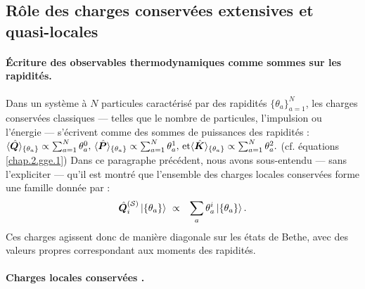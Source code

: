 




%
\subsection{Rôle des charges conservées extensives et quasi-locales}

\paragraph{Écriture des observables thermodynamiques comme sommes sur les rapidités.}

Dans un système à $N$ particules caractérisé par des rapidités $\{ \theta_a \}_{a = 1}^N$, les charges conservées classiques — telles que le nombre de particules, l’impulsion ou l’énergie — s’écrivent comme des sommes de puissances des rapidités :
\(
	\langle \hat{\bm{Q}} \rangle_{\{ \theta_a\} } \propto \sum_{a = 1}^N \theta_a^0 , \,  \langle \hat{\bm{P}} \rangle_{\{ \theta_a\} } \propto \sum_{a = 1}^N \theta_a^1  ,\,  \mbox{et} \langle \hat{\bm{K}} \rangle_{\{ \theta_a\} } \propto \sum_{a = 1}^N \theta_a^2 .	
\)
(cf. équations \eqref{chap.2.gge.1})
Dans ce paragraphe précédent, nous avons sous-entendu — sans l’expliciter — qu’il est montré que l’ensemble des charges locales conservées forme une famille donnée par :
\begin{eqnarray}
	\operator{Q}_i^{(\mathcal{S})} \ket{\{\theta_a\} } & \propto & \sum_a \theta_a^i \ket{\{\theta_a\} }.
\end{eqnarray}
Ces charges agissent donc de manière diagonale sur les états de Bethe, avec des valeurs propres correspondant aux moments des rapidités.
\paragraph{Charges locales conservées .\label{sec:charges-gen}}

